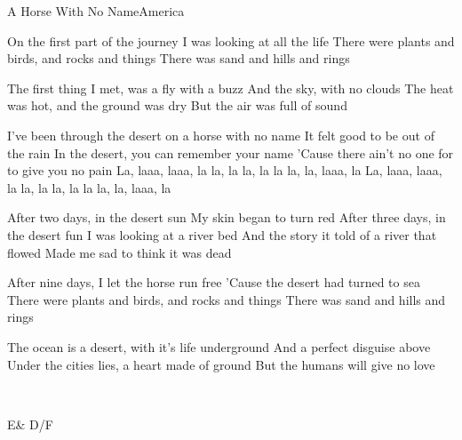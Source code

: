 \documentclass[a4paper,11pt,french]{article}
\begin{document}

\begin{Song}{A Horse With No Name}{America}

\begin{Verse}
On the first part of the journey
I was looking at all the life
There were plants and birds, and rocks and things
There was sand and hills and rings
\espaceInterStrophe

The first thing I met, was a fly with a buzz
And the sky, with no clouds
The heat was hot, and the ground was dry
But the air was full of sound
\end{Verse}
\espaceInterStrophe

\begin{Chorus}
I've been through the desert on a horse with no name
It felt good to be out of the rain
In the desert, you can remember your name
'Cause there ain't no one for to give you no pain
La, laaa, laaa, la la, la la, la la la, la, laaa, la
La, laaa, laaa, la la, la la, la la la, la, laaa, la
\end{Chorus}
\espaceInterStrophe

\begin{Verse}
After two days, in the desert sun
My skin began to turn red
After three days, in the desert fun
I was looking at a river bed
And the story it told of a river that flowed
Made me sad to think it was dead
\end{Verse}
\espaceInterStrophe

\tochorus
\espaceInterStrophe

\begin{Verse}
After nine days, I let the horse run free
'Cause the desert had turned to sea
There were plants and birds, and rocks and things 
There was sand and hills and rings
\espaceInterStrophe

The ocean is a desert, with it's life underground
And a perfect disguise above
Under the cities lies, a heart made of ground
But the humans will give no love
\end{Verse}
\espaceInterStrophe

\tochorus\\
\adlib

\vfill


\begin{Chords}
\hline
E\mineur & D/F\diese\\\hline
\end{Chords}


\vfill

\end{Song}
\end{document}

